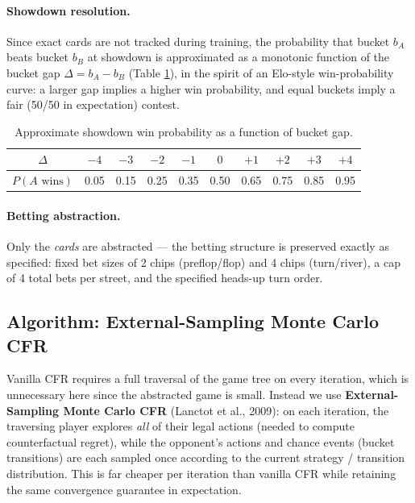 \documentclass[11pt]{article}
\begin{document}
\paragraph{Showdown resolution.} Since exact cards are not tracked during
training, the probability that bucket $b_A$ beats bucket $b_B$ at showdown is
approximated as a monotonic function of the bucket gap $\Delta = b_A - b_B$
(Table \ref{tab:showdown}), in the spirit of an Elo-style win-probability
curve: a larger gap implies a higher win probability, and equal buckets
imply a fair (50/50 in expectation) contest.

\begin{table}[h]
\centering
\begin{tabular}{cccccccccc}
\toprule
$\Delta$ & $-4$ & $-3$ & $-2$ & $-1$ & $0$ & $+1$ & $+2$ & $+3$ & $+4$ \\
\midrule
$P(A \text{ wins})$ & 0.05 & 0.15 & 0.25 & 0.35 & 0.50 & 0.65 & 0.75 & 0.85 & 0.95 \\
\bottomrule
\end{tabular}
\caption{Approximate showdown win probability as a function of bucket gap.}
\label{tab:showdown}
\end{table}

\paragraph{Betting abstraction.} Only the \emph{cards} are abstracted --- the
betting structure is preserved exactly as specified: fixed bet sizes of 2
chips (preflop/flop) and 4 chips (turn/river), a cap of 4 total bets per
street, and the specified heads-up turn order.

\subsection{Algorithm: External-Sampling Monte Carlo CFR}

Vanilla CFR requires a full traversal of the game tree on every iteration,
which is unnecessary here since the abstracted game is small. Instead we use
\textbf{External-Sampling Monte Carlo CFR} (Lanctot et al., 2009): on each
iteration, the traversing player explores \emph{all} of their legal actions
(needed to compute counterfactual regret), while the opponent's actions and
chance events (bucket transitions) are each sampled once according to the
current strategy / transition distribution. This is far cheaper per
iteration than vanilla CFR while retaining the same convergence guarantee in
expectation.
\end{document}

